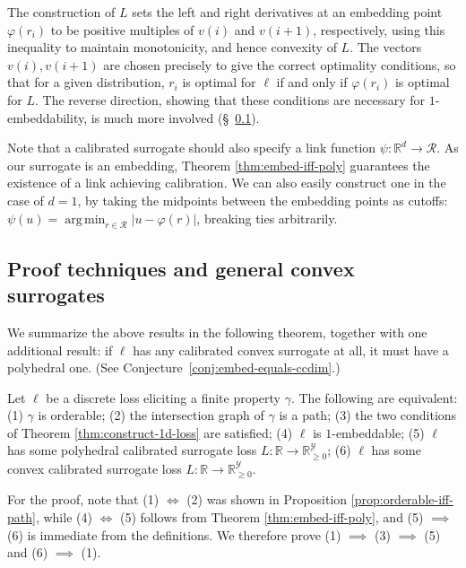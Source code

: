 \documentclass[anon]{colt2020} %
\newcommand{\reals}{\mathbb{R}}
\newcommand{\nonnegreals}{\reals_{\geq 0}}%
\newcommand{\R}{\mathcal{R}}
\newcommand{\Y}{\mathcal{Y}}
\DeclareMathOperator*{\argmin}{arg\,min}
\begin{document}
The construction of $L$ sets the left and right derivatives at an embedding point $\varphi(r_i)$ to be positive multiples of $v(i)$ and $v(i+1)$, respectively, using this inequality to maintain monotonicity, and hence convexity of $L$.
The vectors $v(i),v(i+1)$ are chosen precisely to give the correct optimality conditions, so that for a given distribution, $r_i$ is optimal for $\ell$ if and only if $\varphi(r_i)$ is optimal for $L$.
The reverse direction, showing that these conditions are necessary for $1$-embeddability, is much more involved (\S~\ref{sec:1d-proof-discuss}).

Note that a calibrated surrogate should also specify a link function $\psi: \reals^d \to \R$.
As our surrogate is an embedding, Theorem \ref{thm:embed-iff-poly} guarantees the existence of a link achieving calibration.
We can also easily construct one in the case of $d=1$, by taking the midpoints between the embedding points as cutoffs: $\psi(u) = \argmin_{r \in \R} |u - \varphi(r)|$, breaking ties arbitrarily.

\subsection{Proof techniques and general convex surrogates}
\label{sec:1d-proof-discuss}

We summarize the above results in the following theorem, together with one additional result: if $\ell$ has any calibrated convex surrogate at all, it must have a polyhedral one.
(See Conjecture~\ref{conj:embed-equals-ccdim}.)
\begin{theorem} \label{thm:1d-tfae}
  Let $\ell$ be a discrete loss eliciting a finite property $\gamma$.
  The following are equivalent: (1) $\gamma$ is orderable; (2) the intersection graph of $\gamma$ is a path; (3) the two conditions of Theorem \ref{thm:construct-1d-loss} are satisfied; (4) $\ell$ is $1$-embeddable; (5) $\ell$ has some polyhedral calibrated surrogate loss $L: \reals \to \nonnegreals^{\Y}$; (6) $\ell$ has some convex calibrated surrogate loss $L: \reals \to \nonnegreals^{\Y}$.
\end{theorem}

For the proof, note that
(1) $\iff$ (2) was shown in Proposition \ref{prop:orderable-iff-path}, while
(4) $\iff$ (5) follows from Theorem \ref{thm:embed-iff-poly}, and (5) $\implies$ (6) is immediate from the definitions.
We therefore prove (1) $\implies$ (3) $\implies$ (5) and (6) $\implies$ (1).

\end{document}
